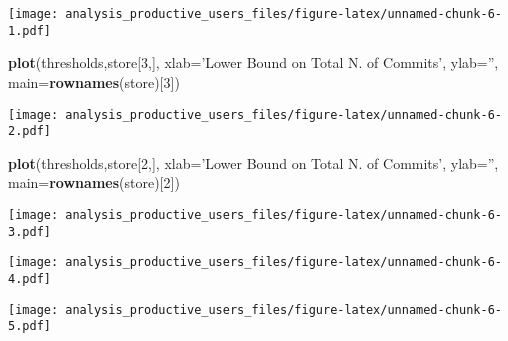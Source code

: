 \documentclass[
]{article}
\newenvironment{Shaded}{\begin{snugshade}}{\end{snugshade}}
\newcommand{\DataTypeTok}[1]{\textcolor[rgb]{0.13,0.29,0.53}{#1}}
\newcommand{\DecValTok}[1]{\textcolor[rgb]{0.00,0.00,0.81}{#1}}
\newcommand{\KeywordTok}[1]{\textcolor[rgb]{0.13,0.29,0.53}{\textbf{#1}}}
\newcommand{\NormalTok}[1]{#1}
\newcommand{\StringTok}[1]{\textcolor[rgb]{0.31,0.60,0.02}{#1}}
\begin{document}
\texttt{[image: analysis\_productive\_users\_files/figure-latex/unnamed-chunk-6-1.pdf]}

\begin{Shaded}
\begin{Highlighting}[]
\KeywordTok{plot}\NormalTok{(thresholds,store[}\DecValTok{3}\NormalTok{,],}
     \DataTypeTok{xlab=}\StringTok{'Lower Bound on Total N. of Commits'}\NormalTok{,}
     \DataTypeTok{ylab=}\StringTok{''}\NormalTok{,}
     \DataTypeTok{main=}\KeywordTok{rownames}\NormalTok{(store)[}\DecValTok{3}\NormalTok{])}
\end{Highlighting}
\end{Shaded}

\texttt{[image: analysis\_productive\_users\_files/figure-latex/unnamed-chunk-6-2.pdf]}

\begin{Shaded}
\begin{Highlighting}[]
\KeywordTok{plot}\NormalTok{(thresholds,store[}\DecValTok{2}\NormalTok{,],}
     \DataTypeTok{xlab=}\StringTok{'Lower Bound on Total N. of Commits'}\NormalTok{,}
     \DataTypeTok{ylab=}\StringTok{''}\NormalTok{,}
     \DataTypeTok{main=}\KeywordTok{rownames}\NormalTok{(store)[}\DecValTok{2}\NormalTok{])}
\end{Highlighting}
\end{Shaded}

\texttt{[image: analysis\_productive\_users\_files/figure-latex/unnamed-chunk-6-3.pdf]}

\begin{Shaded}
\end{Shaded}

\texttt{[image: analysis\_productive\_users\_files/figure-latex/unnamed-chunk-6-4.pdf]}

\begin{Shaded}
\end{Shaded}

\texttt{[image: analysis\_productive\_users\_files/figure-latex/unnamed-chunk-6-5.pdf]}
\end{document}
